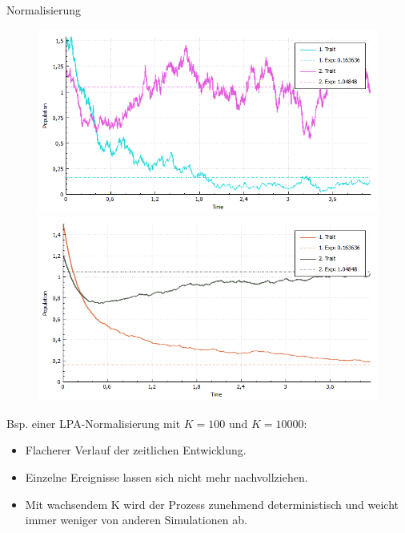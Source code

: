 \documentclass{beamer}
\begin{document}
\begin{frame}{Normalisierung}
	\begin{minipage}{0.49\textwidth}
		\begin{figure}
		\centering		
		\includegraphics[width=1\linewidth]{./Pictures/LPANormalisierungK100}%
		\\\includegraphics[width=1\linewidth]{./Pictures/LPANormalisierungK10000}%
		\end{figure}
	\end{minipage}
	\begin{minipage}{0.49\textwidth}
		Bsp. einer LPA-Normalisierung mit $ K = 100 \text{ und } K = 10000 $:
		\begin{itemize}
			\item Flacherer Verlauf der zeitlichen Entwicklung.\pause
			\item Einzelne Ereignisse lassen sich nicht mehr nachvollziehen.\pause
			\item Mit wachsendem K wird der Prozess zunehmend deterministisch und weicht immer weniger von anderen Simulationen ab.
		\end{itemize}
	\begin{center}
	\end{center}
	\end{minipage}\\
\end{frame}
\end{document}
